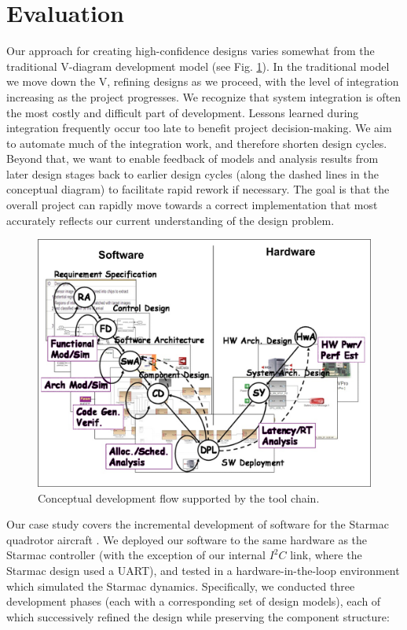 \section{Evaluation}
\label{section:devflow}

Our approach for creating high-confidence designs 
varies somewhat from the traditional V-diagram 
development model (see Fig. \ref{fig:vdiagram}).  In the
traditional model we move down the V, refining designs 
as we proceed, with the level of integration increasing 
as the project progresses.  We recognize that system integration 
is often the most costly and difficult part of development.
Lessons learned during integration frequently occur 
too late to benefit project decision-making.  We aim to 
automate much of the integration work, and therefore shorten 
design cycles.  Beyond that, we want to enable feedback of 
models and analysis results from later design stages back 
to earlier design cycles (along the dashed lines in the 
conceptual diagram) to facilitate rapid rework if necessary.  The
goal is that the overall project can rapidly move towards 
a correct implementation that most accurately reflects our 
current understanding of the design problem.

\begin{figure}
   \centering
   \includegraphics[width=0.85\columnwidth]{figures/vdiagram.png}
   \caption{Conceptual development flow supported by the tool chain.}
   \label{fig:vdiagram}
\end{figure}

Our case study covers the incremental development of software for 
the Starmac quadrotor aircraft \cite{quad:starmac,quad:starmacdyn}.
We deployed our software to the same hardware as the Starmac controller
(with the exception of our internal $I^2C$ link, where the Starmac design
used a UART), and tested in a
hardware-in-the-loop environment which simulated the Starmac
dynamics.  Specifically, we conducted three development phases
(each with a corresponding set of design models), each of which 
successively refined the design while preserving the component
structure:

